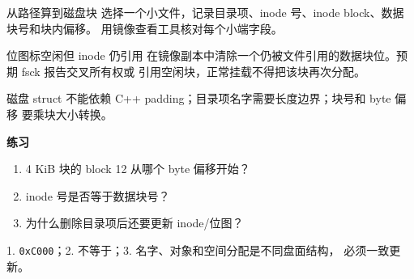 
\begin{experimentbox}{从路径算到磁盘块}
选择一个小文件，记录目录项、inode 号、inode block、数据块号和块内偏移。
用镜像查看工具核对每个小端字段。
\end{experimentbox}

\begin{faultinjectionbox}{位图标空闲但 inode 仍引用}
在镜像副本中清除一个仍被文件引用的数据块位。预期 fsck 报告交叉所有权或
引用空闲块，正常挂载不得把该块再次分配。
\end{faultinjectionbox}

\begin{pitfallbox}
磁盘 struct 不能依赖 C++ padding；目录项名字需要长度边界；块号和 byte 偏移
要乘块大小转换。
\end{pitfallbox}

\textbf{练习}
\begin{enumerate}[leftmargin=2.2em]
  \item 4 KiB 块的 block 12 从哪个 byte 偏移开始？
  \item inode 号是否等于数据块号？
  \item 为什么删除目录项后还要更新 inode/位图？
\end{enumerate}
\begin{answerbox}
1. \texttt{0xC000}；2. 不等于；3. 名字、对象和空间分配是不同盘面结构，
必须一致更新。
\end{answerbox}
